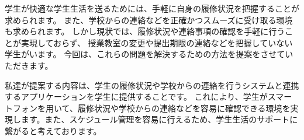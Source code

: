 学生が快適な学生生活を送るためには、手軽に自身の履修状況を把握することが求められます。
また、学校からの連絡などを正確かつスムーズに受け取る環境も求められます。
しかし現状では、履修状況や連絡事項の確認を手軽に行うことが実現しておらず、
授業教室の変更や提出期限の連絡などを把握していない学生がいます。
今回は、これらの問題を解決するための方法を提案をさせていただきます。

私達が提案する内容は、学生の履修状況や学校からの連絡を行うシステムと連携するアプリケーションを学生に提供することです。
これにより、学生がスマートフォンを用いて、履修状況や学校からの連絡などを容易に確認できる環境を実現します。また、スケジュール管理を容易に行えるため、学生生活のサポートに繋がると考えております。
